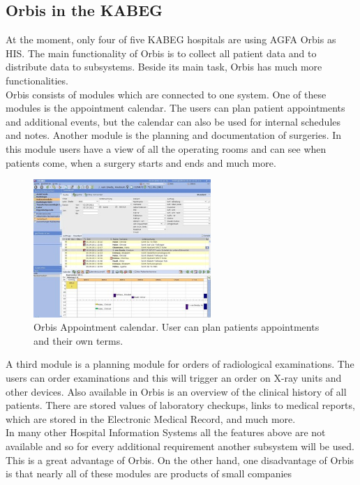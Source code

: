 \documentclass[a4paper]{article}
\begin{document}
	\subsection{Orbis in the KABEG}
	At the moment, only four of five KABEG hospitals are using AGFA Orbis as HIS.
	The main functionality of Orbis is to collect all patient data and to
	distribute data to subsystems. Beside its main task, Orbis has much more
	functionalities.\\
	Orbis consists of modules which are connected to one system. One
	of these modules is the appointment calendar. The users can plan
	patient appointments and additional events, but the calendar can also be used
	for internal schedules and notes.
	Another module is the planning and documentation of surgeries. In this module
	users have a view of all the operating rooms and can see when patients
	come, when a surgery starts and ends and much more.\\
	\begin{figure}[!ht]
		  \centering
		      \includegraphics[width=0.6\textwidth]{orbis1}
		  \caption{Orbis Appointment calendar. User can plan 
		  patients appointments and their own terms.}
	\end{figure}
	A third module is a planning module for orders of radiological
	examinations. The users can order examinations and this will trigger an
	order on X-ray units and other devices. Also available in Orbis is an 
	overview of the clinical history of all patients. There are
	stored values of laboratory checkups, links to medical reports, which are
	stored in the Electronic Medical Record, and much more.\\
	In many other Hospital Information Systems all the features above are not
	available and so for every additional requirement another subsystem will be
	used. This is a great advantage of Orbis. On the other hand, one disadvantage
	of Orbis is that nearly all of these modules are products of small companies
\end{document}
